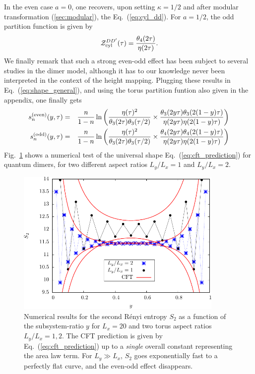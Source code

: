 \documentclass[11pt]{iopart}
\begin{document}
In the even case $a=0$, one recovers, upon setting $\kappa=1/2$ and after modular transformation (\ref{sec:modular}), the Eq.~(\ref{eq:cyl_dd}). For $a=1/2$, the odd partition function is given by 
\begin{equation}
 \mathcal{Z}_{\rm cyl}^{DD^\prime}(\tau)=\frac{\theta_4(2\tau)}{\eta(2\tau)}.
\end{equation}
We finally remark that such a strong even-odd effect has been subject to several studies in the dimer model\cite{Ferdinand,Dimers_all,Ruelledimers}, although it has to our knowledge never been interpreted in the context of the height mapping. Plugging these results in Eq.~(\ref{eq:shape_general}), and using the torus partition funtion\cite{BigYellowBook} also given in the appendix, one finally gets
\begin{eqnarray}\label{eq:cft_prediction}
 s_n^{\rm (even)}(y,\tau)&=&\frac{n}{1-n}\ln \left(\frac{\eta(\tau)^2}{\theta_3(2\tau)\theta_3(\tau/2)}\times\frac{\theta_3(2y \tau)\theta_3(2(1-y)\tau)}{\eta(2y\tau)\eta(2(1-y)\tau)}\right)\\
 s_n^{\rm (odd)}(y,\tau)&=&\frac{n}{1-n}\ln \left(\frac{\eta(\tau)^2}{\theta_3(2\tau)\theta_3(\tau/2)}\times\frac{\theta_4(2y \tau)\theta_4(2(1-y)\tau)}{\eta(2y\tau)\eta(2(1-y)\tau)}\right)
\end{eqnarray}
Fig.~\ref{fig:dimers_shape} shows a numerical test of the universal shape Eq.~(\ref{eq:cft_prediction}) for quantum dimers, for two different aspect ratios $L_y/L_x=1$ and $L_y/L_x=2$.  
\begin{figure}[ht]
\begin{center}
 \includegraphics[width=10cm]{./figures/dimers_shape.pdf}
 \end{center}
 \caption{Numerical results for the second R\'enyi entropy $S_2$ as a function of the subsystem-ratio $y$ for $L_x=20$ and two torus aspect ratios $L_y/L_x=1,2$. The CFT prediction is given by Eq.~(\ref{eq:cft_prediction}) up to a \emph{single} overall constant representing the area law term. For $L_y\gg L_x$, $S_2$ goes exponentially fast to a perfectly flat curve, and the even-odd effect disappears.}
 \label{fig:dimers_shape}
\end{figure}
\end{document}
